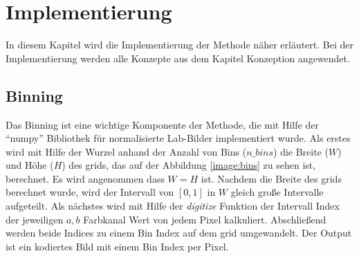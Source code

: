 \chapter{Implementierung}
In diesem Kapitel wird die Implementierung der Methode näher erläutert. Bei der Implementierung werden alle Konzepte aus dem
Kapitel Konzeption angewendet.



  

\section{Binning}
Das Binning ist eine wichtige Komponente der Methode, die mit Hilfe der ``numpy'' Bibliothek für normalisierte Lab-Bilder implementiert wurde. 
Als erstes wird mit Hilfe der Wurzel
anhand der Anzahl von Bins ($n\_bins$) die Breite ($W$) und Höhe ($H$) des \gls{grid}s, das auf der Abbildung \ref{image:bins} zu sehen ist,
berechnet. Es wird angenommen dass $W = H$ ist.
Nachdem die Breite des \gls{grid}s berechnet wurde, wird der Intervall von $[0, 1]$ in $W$ gleich große Intervalle aufgeteilt. Als nächstes
wird mit Hilfe der \textit{digitize} Funktion der Intervall Index der jeweiligen $a, b$ Farbkanal Wert von jedem Pixel kalkuliert. 
Abschließend werden beide Indices zu einem Bin Index auf dem \gls{grid} umgewandelt. Der Output ist ein kodiertes Bild mit einem Bin Index per Pixel.
\\

